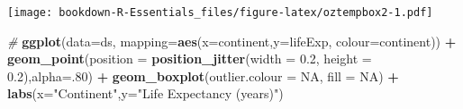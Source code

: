 \documentclass[]{book}
\newenvironment{Shaded}{\begin{snugshade}}{\end{snugshade}}
\newcommand{\KeywordTok}[1]{\textcolor[rgb]{0.13,0.29,0.53}{\textbf{#1}}}
\newcommand{\DataTypeTok}[1]{\textcolor[rgb]{0.13,0.29,0.53}{#1}}
\newcommand{\DecValTok}[1]{\textcolor[rgb]{0.00,0.00,0.81}{#1}}
\newcommand{\FloatTok}[1]{\textcolor[rgb]{0.00,0.00,0.81}{#1}}
\newcommand{\StringTok}[1]{\textcolor[rgb]{0.31,0.60,0.02}{#1}}
\newcommand{\CommentTok}[1]{\textcolor[rgb]{0.56,0.35,0.01}{\textit{#1}}}
\newcommand{\OtherTok}[1]{\textcolor[rgb]{0.56,0.35,0.01}{#1}}
\newcommand{\OperatorTok}[1]{\textcolor[rgb]{0.81,0.36,0.00}{\textbf{#1}}}
\newcommand{\NormalTok}[1]{#1}
\begin{document}
\begin{Shaded}
\end{Shaded}

\texttt{[image: bookdown-R-Essentials\_files/figure-latex/oztempbox2-1.pdf]}

\begin{Shaded}
\begin{Highlighting}[]
\CommentTok{# }
\KeywordTok{ggplot}\NormalTok{(}\DataTypeTok{data=}\NormalTok{ds, }\DataTypeTok{mapping=}\KeywordTok{aes}\NormalTok{(}\DataTypeTok{x=}\NormalTok{continent,}\DataTypeTok{y=}\NormalTok{lifeExp, }\DataTypeTok{colour=}\NormalTok{continent)) }\OperatorTok{+}\StringTok{ }
\StringTok{  }\KeywordTok{geom_point}\NormalTok{(}\DataTypeTok{position =} \KeywordTok{position_jitter}\NormalTok{(}\DataTypeTok{width =} \FloatTok{0.2}\NormalTok{, }\DataTypeTok{height =} \FloatTok{0.2}\NormalTok{),}\DataTypeTok{alpha=}\NormalTok{.}\DecValTok{80}\NormalTok{) }\OperatorTok{+}
\StringTok{ }\KeywordTok{geom_boxplot}\NormalTok{(}\DataTypeTok{outlier.colour =} \OtherTok{NA}\NormalTok{, }\DataTypeTok{fill =} \OtherTok{NA}\NormalTok{) }\OperatorTok{+}\StringTok{ }
\StringTok{  }\KeywordTok{labs}\NormalTok{(}\DataTypeTok{x=}\StringTok{"Continent"}\NormalTok{,}\DataTypeTok{y=}\StringTok{"Life Expectancy (years)"}\NormalTok{)}
\end{Highlighting}
\end{Shaded}
\end{document}
